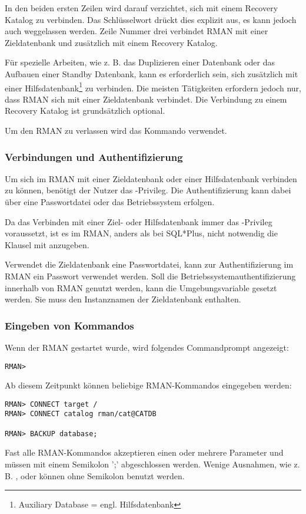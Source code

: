           In den beiden ersten Zeilen wird darauf verzichtet, sich mit einem Recovery Katalog zu verbinden. Das Schl\"usselwort  dr\"uckt dies explizit aus, es kann jedoch auch weggelassen werden. Zeile Nummer drei verbindet RMAN mit einer Zieldatenbank und zus\"atzlich mit einem Recovery Katalog.

          F\"ur spezielle Arbeiten, wie z. B. das Duplizieren einer Datenbank oder das Aufbauen einer Standby Datenbank, kann es erforderlich sein, sich zus\"atzlich mit einer Hilfsdatenbank\footnote{Auxiliary Database = engl. Hilfsdatenbank} zu verbinden. Die meisten T\"atigkeiten erfordern jedoch nur, dass RMAN sich mit einer Zieldatenbank verbindet. Die Verbindung zu einem Recovery Katalog ist grunds\"atzlich optional.

          Um den RMAN zu verlassen wird das Kommando  verwendet.
\clearpage
        \subsubsection{Verbindungen und Authentifizierung}
          \begin{merke}
            Um sich im RMAN mit einer Zieldatenbank oder einer Hilfsdatenbank verbinden zu k\"onnen, be\-n\"o\-tigt der Nutzer das -Privileg. Die Authentifizierung kann dabei \"uber eine Passwortdatei oder das Betriebssystem erfolgen.
          \end{merke}
          Da das Verbinden mit einer Ziel- oder Hilfsdatenbank immer das -Privileg voraussetzt, ist es im RMAN, anders als bei SQL*Plus, nicht notwendig die Klausel  mit anzugeben.

          Verwendet die Zieldatenbank eine Passwortdatei, kann zur Authentifizierung im RMAN ein Passwort verwendet werden. Soll die Be\-triebs\-sys\-tem\-authen\-ti\-fi\-zie\-rung in\-ner\-halb von RMAN genutzt werden, kann die Umgebungsvariable  gesetzt werden. Sie muss den Instanznamen der Zieldatenbank enthalten.
        \subsubsection{Eingeben von Kommandos}
          Wenn der RMAN gestartet wurde, wird folgendes Commandprompt angezeigt:
          \begin{lstlisting}[caption={Das RMAN-Commandprompt},label=admin1002,language=rman]
RMAN>
          \end{lstlisting}
          Ab diesem Zeitpunkt k\"onnen beliebige RMAN-Kommandos eingegeben werden:
          \begin{lstlisting}[caption={Beispiel f\"ur einige RMAN-Kommandos},label=admin1003,language=rman]
RMAN> CONNECT target /
RMAN> CONNECT catalog rman/cat@CATDB

RMAN> BACKUP database;
          \end{lstlisting}
          Fast alle RMAN-Kommandos akzeptieren einen oder mehrere Parameter und m\"ussen mit einem Semikolon ';' abgeschlossen werden. Wenige Ausnahmen, wie z. B. ,  oder  k\"onnen ohne Semikolon benutzt werden.

